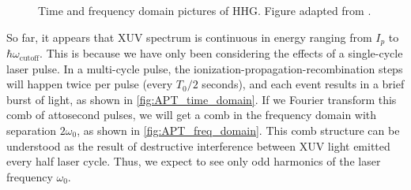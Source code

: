 \begin{figure}
	\centering
	\qquad
	\caption{Time and frequency domain pictures of HHG. Figure adapted from \cite{eichTimeAngleresolvedPhotoemission2014}.}
	\label{fig:APT_IR_field}
\end{figure}

So far, it appears that XUV spectrum is continuous in energy ranging from $I_p$ to $\hbar \omega_{\textrm{cutoff}}$. This is because we have only been considering the effects of a single-cycle laser pulse. In a multi-cycle pulse, the ionization-propagation-recombination steps will happen twice per pulse (every $T_0/2$ seconds), and each event results in a brief burst of light, as shown in \cref{fig:APT_time_domain}. If we Fourier transform this comb of attosecond pulses, we will get a comb in the frequency domain with separation $2 \omega_0$, as shown in \cref{fig:APT_freq_domain}. This comb structure can be understood as the result of destructive interference between XUV light emitted every half laser cycle. Thus, we expect to see only odd harmonics of the laser frequency $\omega_0$. 

